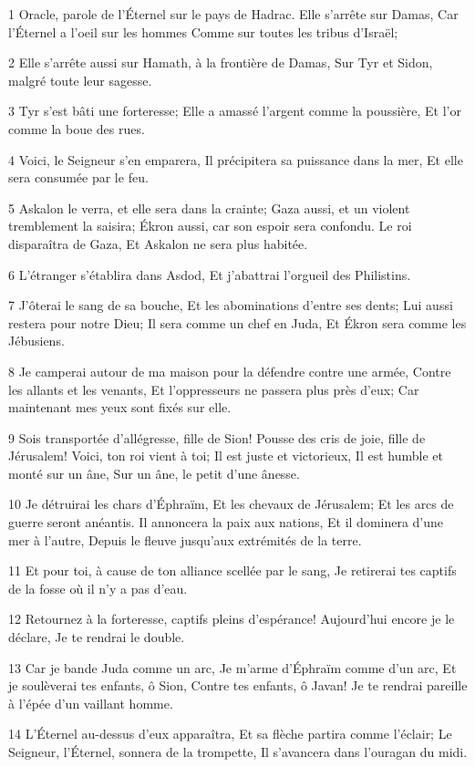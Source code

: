 \par 1 Oracle, parole de l'Éternel sur le pays de Hadrac. Elle s'arrête sur Damas, Car l'Éternel a l'oeil sur les hommes Comme sur toutes les tribus d'Israël;
\par 2 Elle s'arrête aussi sur Hamath, à la frontière de Damas, Sur Tyr et Sidon, malgré toute leur sagesse.
\par 3 Tyr s'est bâti une forteresse; Elle a amassé l'argent comme la poussière, Et l'or comme la boue des rues.
\par 4 Voici, le Seigneur s'en emparera, Il précipitera sa puissance dans la mer, Et elle sera consumée par le feu.
\par 5 Askalon le verra, et elle sera dans la crainte; Gaza aussi, et un violent tremblement la saisira; Ékron aussi, car son espoir sera confondu. Le roi disparaîtra de Gaza, Et Askalon ne sera plus habitée.
\par 6 L'étranger s'établira dans Asdod, Et j'abattrai l'orgueil des Philistins.
\par 7 J'ôterai le sang de sa bouche, Et les abominations d'entre ses dents; Lui aussi restera pour notre Dieu; Il sera comme un chef en Juda, Et Ékron sera comme les Jébusiens.
\par 8 Je camperai autour de ma maison pour la défendre contre une armée, Contre les allants et les venants, Et l'oppresseurs ne passera plus près d'eux; Car maintenant mes yeux sont fixés sur elle.
\par 9 Sois transportée d'allégresse, fille de Sion! Pousse des cris de joie, fille de Jérusalem! Voici, ton roi vient à toi; Il est juste et victorieux, Il est humble et monté sur un âne, Sur un âne, le petit d'une ânesse.
\par 10 Je détruirai les chars d'Éphraïm, Et les chevaux de Jérusalem; Et les arcs de guerre seront anéantis. Il annoncera la paix aux nations, Et il dominera d'une mer à l'autre, Depuis le fleuve jusqu'aux extrémités de la terre.
\par 11 Et pour toi, à cause de ton alliance scellée par le sang, Je retirerai tes captifs de la fosse où il n'y a pas d'eau.
\par 12 Retournez à la forteresse, captifs pleins d'espérance! Aujourd'hui encore je le déclare, Je te rendrai le double.
\par 13 Car je bande Juda comme un arc, Je m'arme d'Éphraïm comme d'un arc, Et je soulèverai tes enfants, ô Sion, Contre tes enfants, ô Javan! Je te rendrai pareille à l'épée d'un vaillant homme.
\par 14 L'Éternel au-dessus d'eux apparaîtra, Et sa flèche partira comme l'éclair; Le Seigneur, l'Éternel, sonnera de la trompette, Il s'avancera dans l'ouragan du midi.
